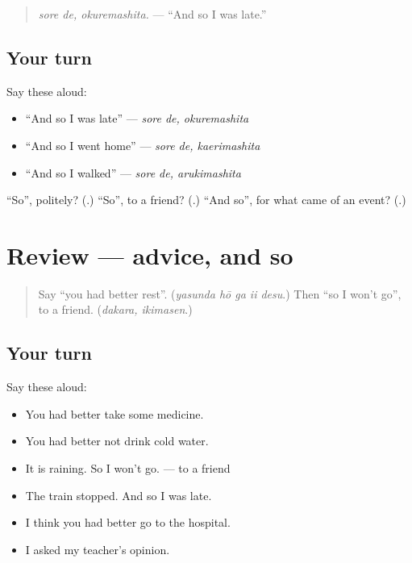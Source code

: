 \begin{quote}
\emph{sore de, okuremashita.} — \textquotedblleft{}And so I was late.\textquotedblright{}
\end{quote}

\subsection*{Your turn}
Say these aloud:

\begin{itemize}
\raggedright
  \item \textquotedblleft{}And so I was late\textquotedblright{} — \emph{sore de, okuremashita}
  \item \textquotedblleft{}And so I went home\textquotedblright{} — \emph{sore de, kaerimashita}
  \item \textquotedblleft{}And so I walked\textquotedblright{} — \emph{sore de, arukimashita}
\end{itemize}

\begin{tcolorbox}[breakable,colback=teal!4,colframe=teal!35!black,title={Before you move on}]
\textquotedblleft{}So\textquotedblright{}, politely? (\textbf{}.) \textquotedblleft{}So\textquotedblright{}, to a friend? (\textbf{}.) \textquotedblleft{}And so\textquotedblright{}, for what came of an event? (\textbf{}.)
\end{tcolorbox}
\section[(review)]{Review — advice, and so}

\label{lesson:JA-R255-advice-and-so}



\begin{quote}
Say \textquotedblleft{}you had better rest\textquotedblright{}. (\emph{yasunda hō ga ii desu}.) Then \textquotedblleft{}so I won't go\textquotedblright{}, to a friend. (\emph{dakara, ikimasen}.)
\end{quote}

\subsection*{Your turn}
Say these aloud:

\begin{itemize}
\raggedright
  \item You had better take some medicine.
  \item You had better not drink cold water.
  \item It is raining. So I won't go. — to a friend
  \item The train stopped. And so I was late.
  \item I think you had better go to the hospital.
  \item I asked my teacher's opinion.
\end{itemize}

